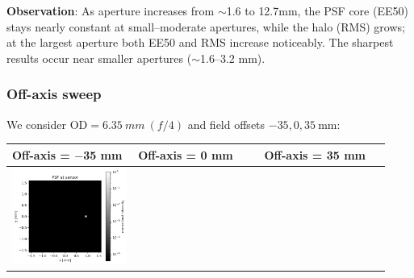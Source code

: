 \documentclass[11pt,a4paper]{article}
\begin{document}
	\textbf{Observation}: As aperture increases from $\sim$1.6 to {12.7}{mm}, the PSF core (EE50) stays nearly constant at small--moderate apertures, while the halo (RMS) grows; at the largest aperture both EE50 and RMS increase noticeably. The sharpest results occur near smaller apertures ($\sim$1.6--3.2 mm).
	
	\subsubsection*{Off-axis sweep}\label{off-axis-sweep}
	
	We consider \(\mathrm{OD}=\SI{6.35}{mm}\ (f/4)\) and field offsets \(-35, 0, 35\ \mathrm{mm}\):
	
	\begin{table}[H]
		\centering
		\begin{tabular}{>{\centering\arraybackslash}m{0.31\linewidth} >{\centering\arraybackslash}m{0.31\linewidth} >{\centering\arraybackslash}m{0.31\linewidth}}
			\toprule
			Off-axis = \(-\)35 mm & Off-axis = 0 mm & Off-axis = 35 mm \\
			\midrule
			\includegraphics[width=\linewidth,keepaspectratio]{offaxis/biconvex_psf_-35.00_log.png} &

\end{tabular}
\end{table}
\end{document}
